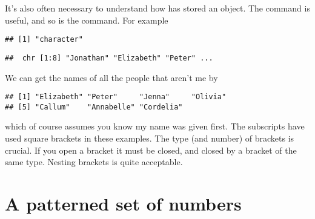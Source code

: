 It's also often necessary to understand how \R{} has stored an object. The  command is useful, and so is the  command. For example 
\begin{knitrout}
\color{fgcolor}\begin{kframe}
\begin{alltt}
\end{alltt}
\begin{verbatim}
## [1] "character"
\end{verbatim}
\begin{alltt}
\end{alltt}
\begin{verbatim}
##  chr [1:8] "Jonathan" "Elizabeth" "Peter" ...
\end{verbatim}
\end{kframe}
\end{knitrout}
We can get the names of all the people that aren't me by 
\begin{knitrout}
\color{fgcolor}\begin{kframe}
\begin{alltt}
\hlstd{Names[}\hlopt{-}\hlstd{]}
\end{alltt}
\begin{verbatim}
## [1] "Elizabeth" "Peter"     "Jenna"     "Olivia"   
## [5] "Callum"    "Annabelle" "Cordelia"
\end{verbatim}
\end{kframe}
\end{knitrout}
which of course assumes you know my name was given first. The subscripts have used square brackets in these examples. The type (and number) of brackets is crucial. If you open a bracket it must be closed, and closed by a bracket of the same type. Nesting brackets is quite acceptable. 
 
 
\section{A patterned set of numbers} 
 
